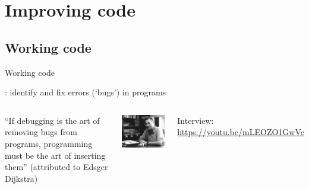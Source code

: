 \documentclass[aspectratio=169,usenames,dvipsnames]{beamer}
\begin{document}
\section{Improving code}
\subsection{Working code}
\frame{\tableofcontents[currentsection]}
\begin{frame}{Working code}
    \begin{definition}
        : identify and fix errors (`bugs') in programs
    \end{definition}

    \pause\vspace{1em}
    \begin{columns}
            ``If debugging is the art of removing bugs from programs,
            programming must be the art of inserting them''
            (attributed to Edsger Dijkstra)

            \includegraphics[height=0.5\textheight]{fig/dijkstra}

            \vspace{1em}
            Interview: \url{https://youtu.be/mLEOZO1GwVc}
    \end{columns}
\end{frame}
\end{document}
